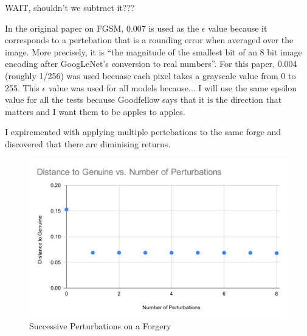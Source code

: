 WAIT, shouldn't we subtract it???

In the original paper on FGSM, 0.007 is used as the $\epsilon$ value because it corresponds to a pertebation that is a rounding error when averaged over the image.
More precisely, it is ``the magnitude of the smallest bit of an 8 bit image encoding after GoogLeNet's conversion to real numbers''\cite{goodfellow}.
For this paper, 0.004 (roughly 1/256) was used becuase each pixel takes a grayscale value from 0 to 255.
This $\epsilon$ value was used for all models because...
I will use the same epsilon value for all the tests because Goodfellow says that it is the direction that matters and I want them to be apples to apples.

I expiremented with applying multiple pertebations to the same forge and discovered that there are diminising returns.
\begin{figure}[h]
    \begin{center}
        \includegraphics[width=0.8\linewidth]{dist_pert_plot.png}
    \end{center}
    \caption{Successive Perturbations on a Forgery}
    \label{fig:dist_vs_perts}
\end{figure}


